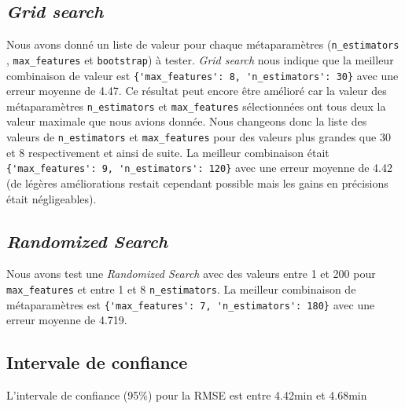 \subsection{\textit{Grid search}}
Nous avons donné un liste de valeur pour chaque métaparamètres (\lstinline!n_estimators! , \lstinline!max_features! et \lstinline!bootstrap!) à tester. \textit{Grid search} nous indique que la meilleur combinaison de valeur est \lstinline!{'max_features': 8, 'n_estimators': 30}! avec une erreur moyenne de 4.47. Ce résultat peut encore être amélioré car la valeur des métaparamètres \lstinline!n_estimators! et \lstinline!max_features! sélectionnées ont tous deux la valeur maximale que nous avions donnée. Nous changeons donc la liste des valeurs de \lstinline!n_estimators! et \lstinline!max_features! pour des valeurs plus grandes que 30 et 8 respectivement et ainsi de suite. La meilleur combinaison était \lstinline!{'max_features': 9, 'n_estimators': 120}! avec une erreur moyenne de 4.42 (de légères améliorations restait cependant possible mais les gains en précisions était négligeables).

\subsection{\textit{Randomized Search}}
Nous avons test une \textit{Randomized Search} avec des valeurs entre 1 et 200 pour \lstinline!max_features! et entre 1 et 8 \lstinline!n_estimators!. La meilleur combinaison de métaparamètres est \lstinline!{'max_features': 7, 'n_estimators': 180}! avec une erreur moyenne de 4.719.

\subsection{Intervale de confiance}
L'intervale de confiance (95\%) pour la RMSE est entre 4.42min et 4.68min
